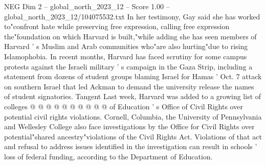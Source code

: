 \begin{textsample}{NEG Dim 2 – global\_north\_2023\_12 – Score 1.00 – global\_north\_2023\_12/104075532.txt}
In her testimony, Gay said she has worked to"confront hate while preserving free expression, calling free expression the"foundation on which Harvard is built,"while adding she has seen members of Harvard ' s Muslim and Arab communities who"are also hurting"due to rising Islamophobia.
In recent months, Harvard has faced scrutiny for some campus protests against the Israeli military ' s campaign in the Gaza Strip, including a statement from dozens of student groups blaming Israel for Hamas ' Oct. 7 attack on southern Israel that led Ackman to demand the university release the names of student signatories.
Tangent Last week, Harvard was added to a growing list of colleges @ @ @ @ @ @ @ @ @ @ of Education ' s Office of Civil Rights over potential civil rights violations.
Cornell, Columbia, the University of Pennsylvania and Wellesley College also face investigations by the Office for Civil Rights over potential"shared ancestry"violations of the Civil Rights Act.
Violations of that act and refusal to address issues identified in the investigation can result in schools ' loss of federal funding, according to the Department of Education.

\end{textsample}
